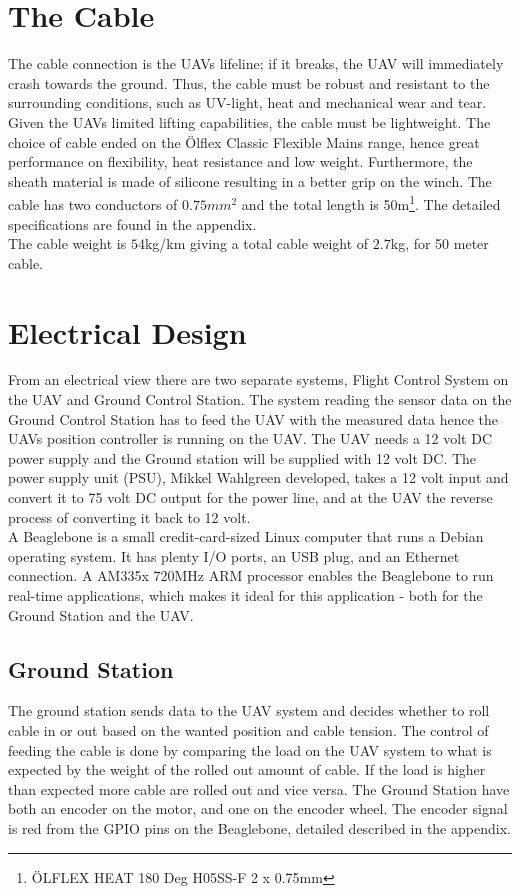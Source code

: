 \section{The Cable}
The cable connection is the UAVs lifeline; if it breaks, the UAV will immediately crash towards the ground. Thus, the cable must be robust and resistant to the surrounding conditions, such as UV-light, heat and mechanical wear and tear.  Given the UAVs limited lifting capabilities, the cable must be lightweight. 
The choice of cable ended on the Ölflex Classic Flexible Mains range, hence great performance on flexibility, heat resistance and low weight. Furthermore, the sheath material is made of silicone resulting in a better grip on the winch. The cable has two conductors of $0.75mm^2$ and the total length is 50m\footnote{ÖLFLEX HEAT 180 Deg H05SS-F 2 x 0.75mm}. The detailed specifications are found in the appendix.\\
The cable weight is $54$kg/km giving a total cable weight of $2.7$kg, for 50 meter cable.


\section{Electrical Design}
From an electrical view there are two separate systems, Flight Control System on the UAV and Ground Control Station. The system reading the sensor data on the Ground Control Station has to feed the UAV with the measured data hence the UAVs position controller is running on the UAV. 
The UAV needs a 12 volt DC power supply and the Ground station will be supplied with 12 volt DC. The power supply unit (PSU), Mikkel Wahlgreen developed, takes a 12 volt input and convert it to 75 volt DC output for the power line, and at the UAV the reverse process of converting it back to 12 volt.\\
A Beaglebone is a small credit-card-sized Linux computer that runs a Debian operating system. It has plenty I/O ports, an USB plug, and an Ethernet connection. A AM335x 720MHz ARM processor enables the Beaglebone to run real-time applications, which makes it ideal for this application - both for the Ground Station and the UAV. 

\subsection{Ground Station}
The ground station sends data to the UAV system and decides whether to roll cable in or out based on the wanted position and cable tension. The control of feeding the cable is done by comparing the load on the UAV system to what is expected by the weight of the rolled out amount of cable. If the load is higher than expected more cable are rolled out and vice versa. The Ground Station have both an encoder on the motor, and one on the encoder wheel. The encoder signal is red from the GPIO pins on the Beaglebone, detailed described in the appendix.
  
